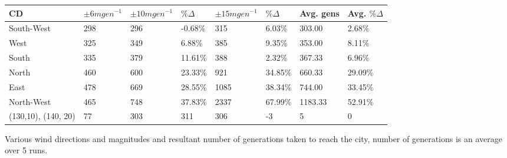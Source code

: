 \documentclass[11pt, a4paper, titlepage]{article}
\begin{document}
\begin{table}[h]
\begin{center}
      \begin{tabular}{|l|l|l|l|l|l|l|l|}
      \hline
      CD  & $\pm6mgen^{-1}$ & $\pm10mgen^{-1}$ & $\% \Delta$ & $\pm15mgen^{-1}$ & $\% \Delta$  & Avg. gens & Avg. $\% \Delta$ \\ \hline
      South-West          & 298                                            & 296                                        & -0.68\% & 315                                  & 6.03\%  & 303.00                                                                        & 2.68\%      \\ \hline
      West                & 325                                            & 349                                        & 6.88\%  & 385                                  & 9.35\%  & 353.00                                                                        & 8.11\%      \\ \hline
      South               & 335                                            & 379                                        & 11.61\% & 388                                  & 2.32\%  & 367.33                                                                        & 6.96\%      \\ \hline
      North               & 460                                            & 600                                        & 23.33\% & 921                                  & 34.85\% & 660.33                                                                        & 29.09\%     \\ \hline
      East                & 478                                            & 669                                        & 28.55\% & 1085                                 & 38.34\% & 744.00                                                                        & 33.45\%     \\ \hline
      North-West          & 465                                            & 748                                        & 37.83\% & 2337                                 & 67.99\% & 1183.33                                                                       & 52.91\%     \\ \hline
      (130,10), (140, 20) & 77                                             & 303                                        & 311     & 306                                  & -3      & 5                                                                             & 0           \\ \hline
      \end{tabular}
    \end{center}
Various wind directions and magnitudes and resultant number of generations taken to reach the city, number of generations is an average over 5 runs.
    \end{table}
\end{document}

